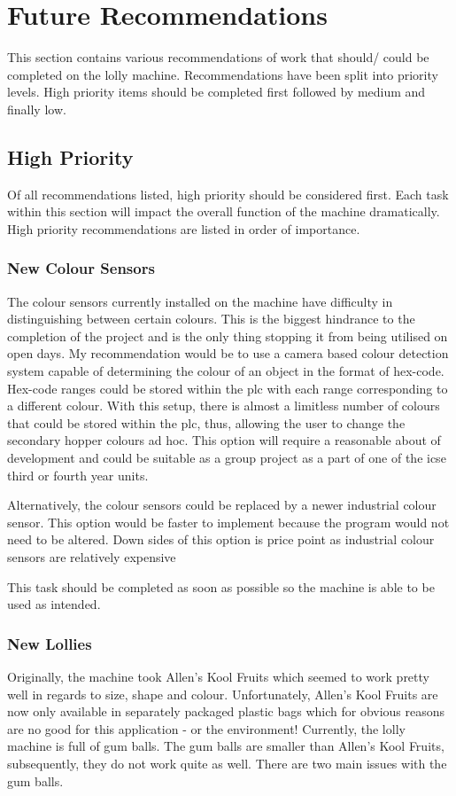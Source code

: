  \section{Future Recommendations}
	This section contains various recommendations of work that should/ could be completed on the lolly machine. Recommendations have been split into priority levels. High priority items should be completed first followed by medium and finally low. 

    \subsection{High Priority}
    Of all recommendations listed, high priority should be considered first. Each task within this section will impact the overall function of the machine dramatically. High priority recommendations are listed in order of importance.
	
        \subsubsection{New Colour Sensors} 
		
            The colour sensors currently installed on the machine have difficulty in distinguishing between certain colours. This is the biggest hindrance to the completion of the project and is the only thing stopping it from being utilised on open days. My recommendation would be to use a camera based colour detection system capable of determining the colour of an object in the format of hex-code. Hex-code ranges could be stored within the \acrshort{plc} with each range corresponding to a different colour. With this setup, there is almost a limitless number of colours that could be stored within the \acrshort{plc}, thus, allowing the user to change the secondary hopper colours ad hoc. This option will require a reasonable about of development and could be suitable as a group project as a part of one of the \acrshort{icse} third or fourth year units.
			
			Alternatively, the colour sensors could be replaced by a newer industrial colour sensor. This option would be faster to implement because the program would not need to be altered. Down sides of this option is price point as industrial colour sensors are relatively expensive
			
			This task should be completed as soon as possible so the machine is able to be used as intended. 
			
            
       \subsubsection{New Lollies} 
            Originally, the machine took Allen's Kool Fruits which seemed to work pretty well in regards to size, shape and colour. Unfortunately, Allen's Kool Fruits are now only available in separately packaged plastic bags which for obvious reasons are no good for this application - or the environment! Currently, the lolly machine is full of gum balls. The gum balls are smaller than Allen's Kool Fruits, subsequently, they do not work quite as well. There are two main issues with the gum balls.
			
